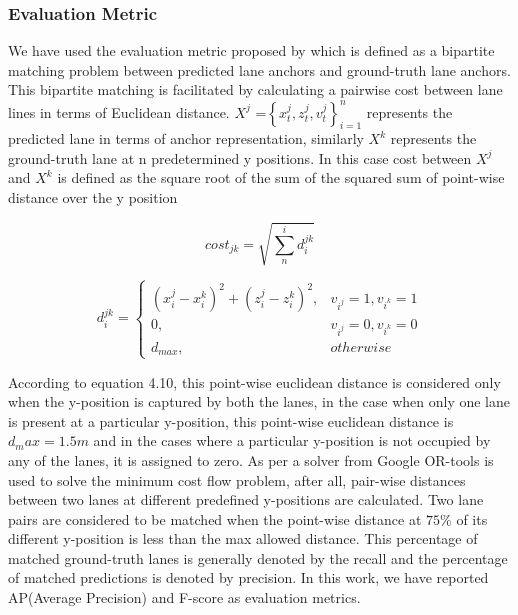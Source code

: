              \subsubsection{Evaluation Metric}
            
            We have used the evaluation metric proposed by \cite{guo2020gen} which is defined as a bipartite matching problem between predicted lane anchors and ground-truth lane anchors. This bipartite matching is facilitated by calculating a pairwise cost between lane lines in terms of Euclidean distance. $X^{j}$ =$ \left\{x^{j}_{t},z^{j}_{t},v^{j}_{t}\right\}_{i=1}^{n}     $ represents the predicted lane in terms of anchor representation, similarly $X^{k}$ represents the ground-truth lane at n predetermined y positions. In this case cost between $X^{j}$ and $X^{k}$ is defined as the square root of the sum of the squared sum of point-wise distance over the y position
            
            \begin{equation}
             cost_{jk} = \sqrt{\sum_n^i d_{i}^{jk}}
            \end{equation}
            
            \begin{equation}
              d_{i}^{jk} = \begin{cases}(x_{i}^{j} - x_{i}^{k} )^{2} + (z_{i}^{j} - z_{i}^{k} )^{2},  & v_{i^{j}} =1, v_{i^{k}} =1 \\0,   & v_{i^{j}} =0, v_{i^{k}} =0\\ d_{max}, & otherwise\end{cases}
            \end{equation}
            
            According to equation 4.10, this point-wise euclidean distance is considered only when the y-position is captured by both the lanes, in the case when only one lane is present at a particular y-position, this point-wise euclidean distance is $d_max = 1.5m$ and in the cases where a particular y-position is not occupied by any of the lanes, it is assigned to zero. As per \cite{guo2020gen} a solver from Google OR-tools is used to solve the minimum cost flow problem, after all, pair-wise distances between two lanes at different predefined y-positions are calculated. Two lane pairs are considered to be matched when the point-wise distance at $75\%$ of its different y-position is less than the max allowed distance. This percentage of matched ground-truth lanes is generally denoted by the recall and the percentage of matched predictions is denoted by precision. In this work, we have reported AP(Average Precision) and F-score as evaluation metrics. 
            
